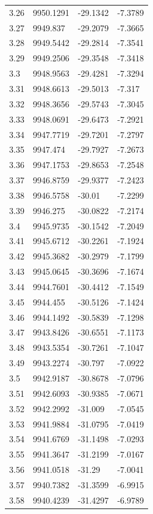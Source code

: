 \begin{table}[H]
\begin{tabular}{llll}
3.26 & 9950.1291 & -29.1342 & -7.3789 \\
3.27 & 9949.837 & -29.2079 & -7.3665 \\
3.28 & 9949.5442 & -29.2814 & -7.3541 \\
3.29 & 9949.2506 & -29.3548 & -7.3418 \\
3.3 & 9948.9563 & -29.4281 & -7.3294 \\
3.31 & 9948.6613 & -29.5013 & -7.317 \\
3.32 & 9948.3656 & -29.5743 & -7.3045 \\
3.33 & 9948.0691 & -29.6473 & -7.2921 \\
3.34 & 9947.7719 & -29.7201 & -7.2797 \\
3.35 & 9947.474 & -29.7927 & -7.2673 \\
3.36 & 9947.1753 & -29.8653 & -7.2548 \\
3.37 & 9946.8759 & -29.9377 & -7.2423 \\
3.38 & 9946.5758 & -30.01 & -7.2299 \\
3.39 & 9946.275 & -30.0822 & -7.2174 \\
3.4 & 9945.9735 & -30.1542 & -7.2049 \\
3.41 & 9945.6712 & -30.2261 & -7.1924 \\
3.42 & 9945.3682 & -30.2979 & -7.1799 \\
3.43 & 9945.0645 & -30.3696 & -7.1674 \\
3.44 & 9944.7601 & -30.4412 & -7.1549 \\
3.45 & 9944.455 & -30.5126 & -7.1424 \\
3.46 & 9944.1492 & -30.5839 & -7.1298 \\
3.47 & 9943.8426 & -30.6551 & -7.1173 \\
3.48 & 9943.5354 & -30.7261 & -7.1047 \\
3.49 & 9943.2274 & -30.797 & -7.0922 \\
3.5 & 9942.9187 & -30.8678 & -7.0796 \\
3.51 & 9942.6093 & -30.9385 & -7.0671 \\
3.52 & 9942.2992 & -31.009 & -7.0545 \\
3.53 & 9941.9884 & -31.0795 & -7.0419 \\
3.54 & 9941.6769 & -31.1498 & -7.0293 \\
3.55 & 9941.3647 & -31.2199 & -7.0167 \\
3.56 & 9941.0518 & -31.29 & -7.0041 \\
3.57 & 9940.7382 & -31.3599 & -6.9915 \\
3.58 & 9940.4239 & -31.4297 & -6.9789 \\

\end{tabular}
\end{table}
